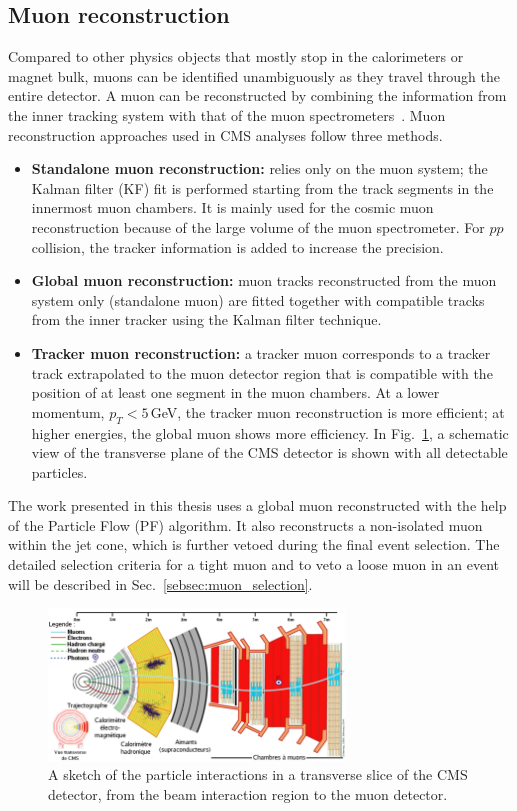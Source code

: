 \subsection{Muon reconstruction} 
Compared to other physics objects that mostly stop in the calorimeters or magnet bulk, muons can be identified unambiguously as they travel through the entire detector. A muon can be reconstructed by combining the information from the inner tracking system with that of the muon spectrometers~\cite{Chatrchyan:2012xi}. Muon reconstruction approaches used in CMS analyses follow three methods.
\begin{itemize}
\item\textbf{Standalone muon reconstruction:}
relies only on the muon system; the Kalman filter (KF) fit is performed starting from the track segments in the innermost muon chambers. It is mainly used for the cosmic muon reconstruction because of the large volume of the muon spectrometer. For $pp$ collision, the tracker information is added to increase the precision. 
\item\textbf{Global muon reconstruction:}
muon tracks reconstructed from the muon system only (standalone muon) are fitted together with compatible tracks from the inner tracker using the Kalman filter technique. 
\item\textbf{Tracker muon reconstruction:}
a tracker muon corresponds to a tracker track extrapolated to the muon detector region that is compatible with the position of at least one segment in the muon chambers.
At a lower momentum, $p_T < 5$\,GeV, the tracker muon reconstruction is more efficient; at higher energies, the global muon shows more efficiency. In Fig.~\ref{fig:cms_quadrant}, a schematic view of the transverse plane of the CMS detector is shown with all detectable particles.  
\end{itemize}
The work presented in this thesis uses a global muon reconstructed with the help of the Particle Flow (PF) algorithm. It also reconstructs a non-isolated muon within the jet cone, which is further vetoed during the final event selection. The detailed selection criteria for a tight muon and to veto a loose muon in an event will be described in Sec.~\ref{sebsec:muon_selection}. 
\begin{figure}[h]
\centering
\includegraphics[width=0.7\textwidth]{fig/chapt4/cms_quadrant.png}
\caption{\label{fig:cms_quadrant} A sketch of the particle interactions in a transverse slice of the CMS detector, from the beam interaction region to the muon detector.}
\end{figure}  


